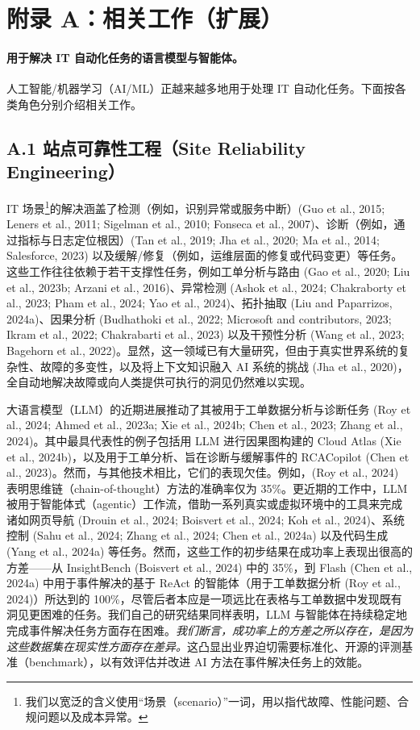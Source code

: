 \section{附录 A：相关工作（扩展）}

\paragraph{用于解决 IT 自动化任务的语言模型与智能体。}
人工智能/机器学习（AI/ML）正越来越多地用于处理 IT 自动化任务。下面按各类角色分别介绍相关工作。

\subsection{A.1 站点可靠性工程（Site Reliability Engineering）}

IT 场景\footnote{我们以宽泛的含义使用“场景（scenario）”一词，用以指代故障、性能问题、合规问题以及成本异常。}的解决涵盖了检测（例如，识别异常或服务中断）(Guo et al., 2015; Leners et al., 2011; Sigelman et al., 2010; Fonseca et al., 2007)、诊断（例如，通过指标与日志定位根因）(Tan et al., 2019; Jha et al., 2020; Ma et al., 2014; Salesforce, 2023) 以及缓解/修复（例如，运维层面的修复或代码变更）等任务。这些工作往往依赖于若干支撑性任务，例如工单分析与路由 (Gao et al., 2020; Liu et al., 2023b; Arzani et al., 2016)、异常检测 (Ashok et al., 2024; Chakraborty et al., 2023; Pham et al., 2024; Yao et al., 2024)、拓扑抽取 (Liu and Paparrizos, 2024a)、因果分析 (Budhathoki et al., 2022; Microsoft and contributors, 2023; Ikram et al., 2022; Chakrabarti et al., 2023) 以及干预性分析 (Wang et al., 2023; Bagehorn et al., 2022)。显然，这一领域已有大量研究，但由于真实世界系统的复杂性、故障的多变性，以及将上下文知识融入 AI 系统的挑战 (Jha et al., 2020)，全自动地解决故障或向人类提供可执行的洞见仍然难以实现。

大语言模型（LLM）的近期进展推动了其被用于工单数据分析与诊断任务 (Roy et al., 2024; Ahmed et al., 2023a; Xie et al., 2024b; Chen et al., 2023; Zhang et al., 2024)。其中最具代表性的例子包括用 LLM 进行因果图构建的 Cloud Atlas (Xie et al., 2024b)，以及用于工单分析、旨在诊断与缓解事件的 RCACopilot (Chen et al., 2023)。然而，与其他技术相比，它们的表现欠佳。例如，(Roy et al., 2024) 表明思维链（chain-of-thought）方法的准确率仅为 35\%。更近期的工作中，LLM 被用于智能体式（agentic）工作流，借助一系列真实或虚拟环境中的工具来完成诸如网页导航 (Drouin et al., 2024; Boisvert et al., 2024; Koh et al., 2024)、系统控制 (Sahu et al., 2024; Zhang et al., 2024; Chen et al., 2024a) 以及代码生成 (Yang et al., 2024a) 等任务。然而，这些工作的初步结果在成功率上表现出很高的方差——从 InsightBench (Boisvert et al., 2024) 中的 35\%，到 Flash (Chen et al., 2024a) 中用于事件解决的基于 ReAct 的智能体（用于工单数据分析 (Roy et al., 2024)）所达到的 100\%，尽管后者本应是一项远比在表格与工单数据中发现既有洞见更困难的任务。我们自己的研究结果同样表明，LLM 与智能体在持续稳定地完成事件解决任务方面存在困难。\textit{我们断言，成功率上的方差之所以存在，是因为这些数据集在现实性方面存在差异。}这凸显出业界迫切需要标准化、开源的评测基准（benchmark），以有效评估并改进 AI 方法在事件解决任务上的效能。

